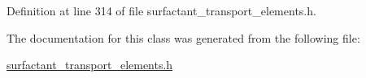 Definition at line 314 of file surfactant\+\_\+transport\+\_\+elements.\+h.



The documentation for this class was generated from the following file\+:\begin{DoxyCompactItemize}
\item 
\hyperlink{surfactant__transport__elements_8h}{surfactant\+\_\+transport\+\_\+elements.\+h}\end{DoxyCompactItemize}
